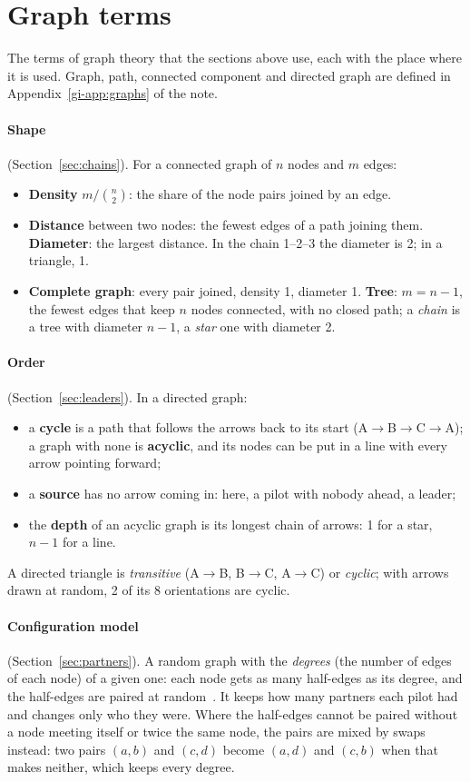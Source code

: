 \section{Graph terms}\label{app:graphs}

The terms of graph theory that the sections above use, each with the place where it is used. Graph,
path, connected component and directed graph are defined in Appendix~\ref{gi-app:graphs} of the note.

\paragraph{Shape} (Section~\ref{sec:chains}). For a connected graph of $n$ nodes and $m$ edges:
\begin{itemize}
  \item \textbf{Density} $m/\binom{n}{2}$: the share of the node pairs joined by an edge.
  \item \textbf{Distance} between two nodes: the fewest edges of a path joining them.
        \textbf{Diameter}: the largest distance. In the chain 1--2--3 the diameter is 2; in a
        triangle, 1.
  \item \textbf{Complete graph}: every pair joined, density 1, diameter 1. \textbf{Tree}: $m=n-1$,
        the fewest edges that keep $n$ nodes connected, with no closed path; a \emph{chain} is a tree
        with diameter $n-1$, a \emph{star} one with diameter 2.
\end{itemize}

\paragraph{Order} (Section~\ref{sec:leaders}). In a directed graph:
\begin{itemize}
  \item a \textbf{cycle} is a path that follows the arrows back to its start (A$\to$B$\to$C$\to$A);
        a graph with none is \textbf{acyclic}, and its nodes can be put in a line with every arrow
        pointing forward;
  \item a \textbf{source} has no arrow coming in: here, a pilot with nobody ahead, a leader;
  \item the \textbf{depth} of an acyclic graph is its longest chain of arrows: 1 for a star, $n-1$
        for a line.
\end{itemize}
A directed triangle is \emph{transitive} (A$\to$B, B$\to$C, A$\to$C) or \emph{cyclic}; with arrows
drawn at random, 2 of its 8 orientations are cyclic.

\paragraph{Configuration model} (Section~\ref{sec:partners}). A random graph with the
\emph{degrees} (the number of edges of each node) of a given one: each node gets as many half-edges
as its degree, and the half-edges are paired at random~\cite{newman2010}. It keeps how many
partners each pilot had and changes only who they were.
Where the half-edges cannot be paired without a node meeting itself or twice the same node, the
pairs are mixed by swaps instead: two pairs $(a,b)$ and $(c,d)$ become $(a,d)$ and $(c,b)$ when
that makes neither, which keeps every degree.
